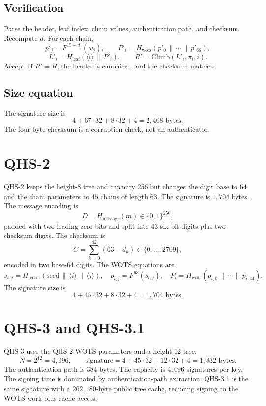 \documentclass[11pt,a4paper]{article}
\theoremstyle{remark}
\newcommand{\concat}{\,\|\,}
\newcommand{\bits}{\{0,1\}}
\begin{document}
\subsection{Verification}

Parse the header, leaf index, chain values, authentication path, and checksum.
Recompute \(d\). For each chain,
\[
p'_j=F^{15-d_j}(w_j),
\qquad
P'_i=H_{\text{wots}}(p'_0\concat\cdots\concat p'_{66}),
\]
\[
L'_i=H_{\text{leaf}}(\langle i\rangle\concat P'_i),
\qquad
R'=\mathrm{Climb}(L'_i,\pi_i,i).
\]
Accept iff \(R'=R\), the header is canonical, and the checksum matches.

\subsection{Size equation}

The signature size is
\[
4+67\cdot 32+8\cdot 32+4=2{,}408\text{ bytes}.
\]
The four-byte checksum is a corruption check, not an authenticator.

\section{QHS-2}

QHS-2 keeps the height-8 tree and capacity 256 but changes the digit base to
\(64\) and the chain parameters to \(45\) chains of length \(63\). The signature
is \(1{,}704\) bytes. The message encoding is
\[
D=H_{\text{message}}(m)\in\bits^{256},
\]
padded with two leading zero bits and split into \(43\) six-bit digits plus two
checksum digits. The checksum is
\[
C=\sum_{k=0}^{42}(63-d_k)\in\{0,\dots,2709\},
\]
encoded in two base-64 digits. The WOTS equations are
\[
s_{i,j}=H_{\text{secret}}(\mathrm{seed}\concat\langle i\rangle\concat\langle j\rangle),
\quad
p_{i,j}=F^{63}(s_{i,j}),
\quad
P_i=H_{\text{wots}}(p_{i,0}\concat\cdots\concat p_{i,44}).
\]
The signature size is
\[
4+45\cdot 32+8\cdot 32+4=1{,}704\text{ bytes}.
\]

\section{QHS-3 and QHS-3.1}

QHS-3 uses the QHS-2 WOTS parameters and a height-12 tree:
\[
N=2^{12}=4{,}096,\qquad
\text{signature}=4+45\cdot 32+12\cdot 32+4=1{,}832\text{ bytes}.
\]
The authentication path is \(384\) bytes. The capacity is \(4{,}096\)
signatures per key. The signing time is dominated by authentication-path
extraction; QHS-3.1 is the same signature with a \(262{,}180\)-byte public tree
cache, reducing signing to the WOTS work plus cache access.
\end{document}
